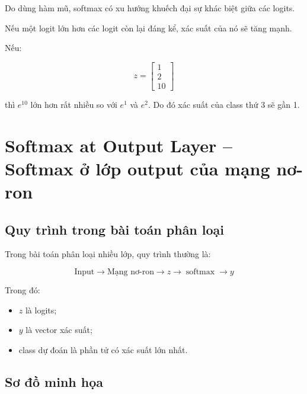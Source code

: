 Do dùng hàm mũ, softmax có xu hướng khuếch đại sự khác biệt giữa các logits.

Nếu một logit lớn hơn các logit còn lại đáng kể, xác suất của nó sẽ tăng mạnh.

\begin{vidu}
Nếu:

\[
    z =
    \begin{bmatrix}
    1\\
    2\\
    10
    \end{bmatrix}
\]

thì $e^{10}$ lớn hơn rất nhiều so với $e^1$ và $e^2$. Do đó xác suất của class thứ 3 sẽ gần 1.
\end{vidu}

\section{Softmax at Output Layer -- Softmax ở lớp output của mạng nơ-ron}

\subsection{Quy trình trong bài toán phân loại}

Trong bài toán phân loại nhiều lớp, quy trình thường là:

\[
    \text{Input}
    \rightarrow
    \text{Mạng nơ-ron}
    \rightarrow
    z
    \rightarrow
    \operatorname{softmax}
    \rightarrow
    y
\]

Trong đó:

\begin{itemize}
    \item $z$ là logits;
    \item $y$ là vector xác suất;
    \item class dự đoán là phần tử có xác suất lớn nhất.
\end{itemize}

\subsection{Sơ đồ minh họa}

\begin{center}
\end{center}

